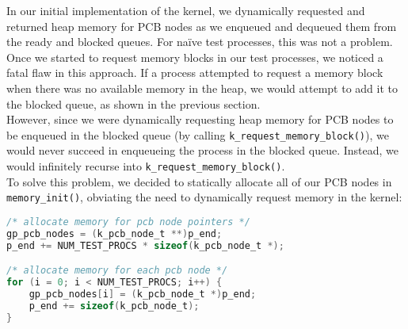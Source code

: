 \documentclass[12pt]{report}
\begin{document}
In our initial implementation of the kernel, we dynamically requested and returned heap memory for PCB nodes as we enqueued and dequeued them from the ready and blocked queues. For na\"{i}ve test processes, this was not a problem.\\

Once we started to request memory blocks in our test processes, we noticed a fatal flaw in this approach. If a process attempted to request a memory block when there was no available memory in the heap, we would attempt to add it to the blocked queue, as shown in the previous section.\\

However, since we were dynamically requesting heap memory for PCB nodes to be enqueued in the blocked queue (by calling \texttt{k_request_memory_block()}), we would never succeed in enqueueing the process in the blocked queue. Instead, we would infinitely recurse into \texttt{k_request_memory_block()}.\\

To solve this problem, we decided to statically allocate all of our PCB nodes in \texttt{memory_init()}, obviating the need to dynamically request memory in the kernel:

\begin{minipage}{\textwidth}
\begin{lstlisting}[language=C]
/* allocate memory for pcb node pointers */
gp_pcb_nodes = (k_pcb_node_t **)p_end;
p_end += NUM_TEST_PROCS * sizeof(k_pcb_node_t *);

/* allocate memory for each pcb node */
for (i = 0; i < NUM_TEST_PROCS; i++) {
    gp_pcb_nodes[i] = (k_pcb_node_t *)p_end;
    p_end += sizeof(k_pcb_node_t); 
}
\end{lstlisting}
\end{minipage}
\end{document}

